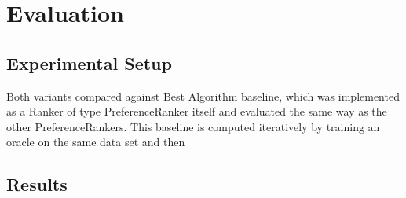 %
\chapter{Evaluation}
\label{sec:evaluation}

\section{Experimental Setup}




Both variants compared against Best Algorithm baseline, which was implemented as a Ranker of type PreferenceRanker itself and evaluated the same way as the other PreferenceRankers. This baseline is computed iteratively by training an oracle on the same data set and then 



\section{Results}






